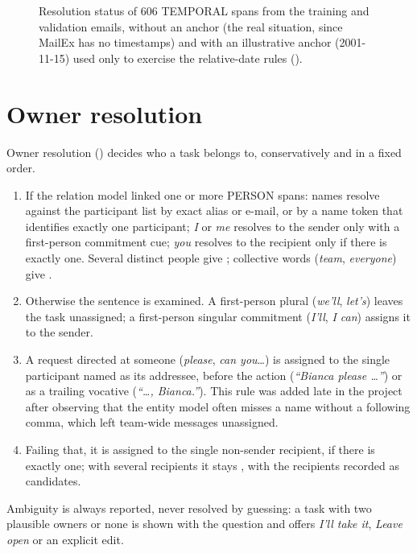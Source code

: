 \begin{figure}[t]
\centering
{}
\caption[Temporal resolution status on the corpus]{Resolution status of 606 TEMPORAL spans from the training and validation emails, without an anchor (the real situation, since MailEx has no timestamps) and with an illustrative anchor (2001-11-15) used only to exercise the relative-date rules ().}
\label{fig:temporalstatus}
\end{figure}

\section{Owner resolution}
Owner resolution () decides who a task belongs to, conservatively and in a fixed order.
\begin{enumerate}
  \item If the relation model linked one or more PERSON spans: names resolve against the participant list by exact alias or e-mail, or by a name token that identifies exactly one participant; \emph{I} or \emph{me} resolves to the sender only with a first-person commitment cue; \emph{you} resolves to the recipient only if there is exactly one. Several distinct people give ; collective words (\emph{team}, \emph{everyone}) give .
  \item Otherwise the sentence is examined. A first-person plural (\emph{we'll}, \emph{let's}) leaves the task unassigned; a first-person singular commitment (\emph{I'll}, \emph{I can}) assigns it to the sender.
  \item A request directed at someone (\emph{please}, \emph{can you}\ldots) is assigned to the single participant named as its addressee, before the action (\emph{``Bianca please \ldots''}) or as a trailing vocative (\emph{``\ldots, Bianca.''}). This rule was added late in the project after observing that the entity model often misses a name without a following comma, which left team-wide messages unassigned.
  \item Failing that, it is assigned to the single non-sender recipient, if there is exactly one; with several recipients it stays , with the recipients recorded as candidates.
\end{enumerate}
Ambiguity is always reported, never resolved by guessing: a task with two plausible owners or none is shown with the question and offers \emph{I'll take it}, \emph{Leave open} or an explicit edit.

